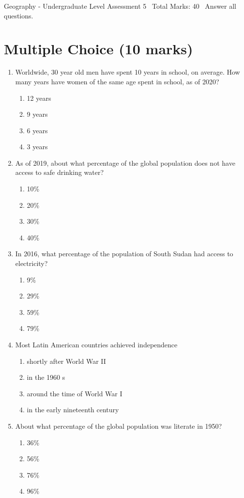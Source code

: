 \documentclass[12pt]{article}
\begin{document}
\begin{center}
Geography - Undergraduate Level Assessment 5 \
Total Marks: 40 \
Answer all questions.
\end{center}

\section*{Multiple Choice (10 marks)}
\begin{enumerate}[label=\arabic*.]
\item Worldwide, 30 year old men have spent 10 years in school, on average. How many years have women of the same age spent in school, as of 2020?
\begin{enumerate}[label=(\alph*)]
    \item 12 years
    \item 9 years
    \item 6 years
    \item 3 years
\end{enumerate}
\item As of 2019, about what percentage of the global population does not have access to safe drinking water?
\begin{enumerate}[label=(\alph*)]
    \item 10\%
    \item 20\%
    \item 30\%
    \item 40\%
\end{enumerate}
\item In 2016, what percentage of the population of South Sudan had access to electricity?
\begin{enumerate}[label=(\alph*)]
    \item 9\%
    \item 29\%
    \item 59\%
    \item 79\%
\end{enumerate}
\item Most Latin American countries achieved independence
\begin{enumerate}[label=(\alph*)]
    \item shortly after World War II
    \item in the 1960 s
    \item around the time of World War I
    \item in the early nineteenth century
\end{enumerate}
\item About what percentage of the global population was literate in 1950?
\begin{enumerate}[label=(\alph*)]
    \item 36\%
    \item 56\%
    \item 76\%
    \item 96\%
\end{enumerate}
\end{enumerate}
\end{document}
